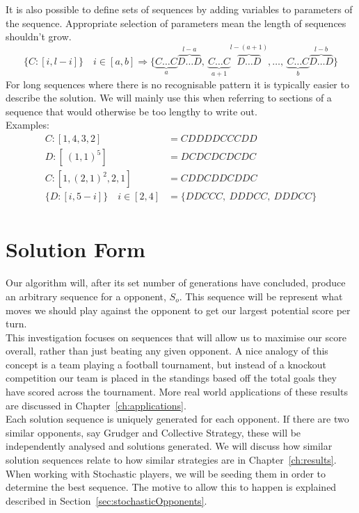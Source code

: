 It is also possible to define sets of sequences by adding variables to parameters of the sequence.
Appropriate selection of parameters mean the length of sequences shouldn't grow.
\[ \{C:[i,l-i]\} \quad i\in [a,b] \Rightarrow \{\underbrace{C\ldots C}_{a}\overbrace{D\ldots D}^{l-a},\ \underbrace{C\ldots C}_{a+1}\overbrace{D\ldots D}^{l-(a+1)},\ldots ,\ \underbrace{C\ldots C}_{b}\overbrace{D\ldots D}^{l-b}\} \]
For long sequences where there is no recognisable pattern it is typically easier to describe the solution.
We will mainly use this when referring to sections of a sequence that would otherwise be too lengthy to write out.\\

Examples:
\begin{align}
    C:[1,4,3,2] &= CDDDDCCCDD\\
    D:[\ (1,1)^{5}] &= DCDCDCDCDC\\
    C:[1,(2,1)^{2},2,1] &= CDDCDDCDDC\\
    \{D:[i,5-i]\} \quad i\in [2,4] &= \{DDCCC,\ DDDCC,\ DDDCC\}\\
\end{align}

\section{Solution Form}\label{sec:solutionForm}
Our algorithm will, after its set number of generations have concluded, produce an arbitrary sequence for a opponent, \(S_o\).
This sequence will be represent what moves we should play against the opponent to get our largest potential score per turn.\\

This investigation focuses on sequences that will allow us to maximise our score overall, rather than just beating any given opponent.
A nice analogy of this concept is a team playing a football tournament, but instead of a knockout competition our team is placed in the standings based off the total goals they have scored across the tournament.
More real world applications of these results are discussed in Chapter~\ref{ch:applications}.\\

Each solution sequence is uniquely generated for each opponent.
If there are two similar opponents, say Grudger and Collective Strategy, these will be independently analysed and solutions generated.
We will discuss how similar solution sequences relate to how similar strategies are in Chapter~\ref{ch:results}.
When working with Stochastic players, we will be seeding them in order to determine the best sequence.
The motive to allow this to happen is explained described in Section~\ref{sec:stochasticOpponents}.

